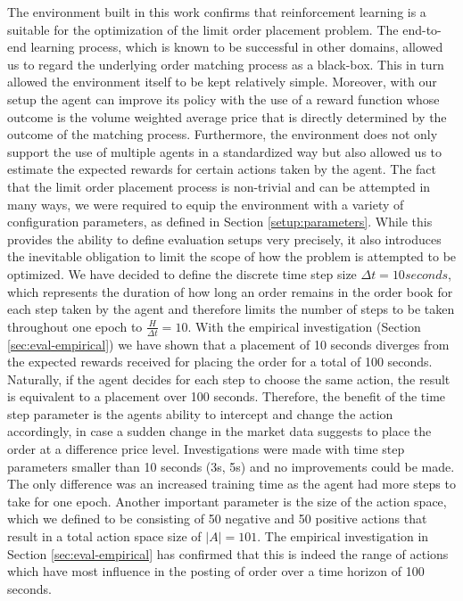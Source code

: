     The environment built in this work confirms that reinforcement learning is a suitable for the optimization of the limit order placement problem.
    The end-to-end learning process, which is known to be successful in other domains\cite{amodei2016deep, mnih2015human, mnih2013playing}, allowed us to regard the underlying order matching process as a black-box.
    This in turn allowed the environment itself to be kept relatively simple.
    Moreover, with our setup the agent can improve its policy with the use of a reward function whose outcome is the volume weighted average price that is directly determined by the outcome of the matching process.
    Furthermore, the environment does not only support the use of multiple agents in a standardized way but also allowed us to estimate the expected rewards for certain actions taken by the agent.
    The fact that the limit order placement process is non-trivial and can be attempted in many ways, we were required to equip the environment with a variety of configuration parameters, as defined in Section \ref{setup:parameters}.
    While this provides the ability to define evaluation setups very precisely, it also introduces the inevitable obligation to limit the scope of how the problem is attempted to be optimized.
    We have decided to define the discrete time step size $\Delta{t}=10 seconds$, which represents the duration of how long an order remains in the order book for each step taken by the agent and therefore limits the number of steps to be taken throughout one epoch to $\frac{H}{\Delta{t}}=10$.
    With the empirical investigation (Section \ref{sec:eval-empirical}) we have shown that a placement of 10 seconds diverges from the expected rewards received for placing the order for a total of 100 seconds.
    Naturally, if the agent decides for each step to choose the same action, the result is equivalent to a placement over 100 seconds.
    Therefore, the benefit of the time step parameter is the agents ability to intercept and change the action accordingly, in case a sudden change in the market data suggests to place the order at a difference price level.
    Investigations were made with time step parameters smaller than 10 seconds (3s, 5s) and no improvements could be made.
    The only difference was an increased training time as the agent had more steps to take for one epoch.
    Another important parameter is the size of the action space, which we defined to be consisting of 50 negative and 50 positive actions that result in a total action space size of $|A|=101$.
    The empirical investigation in Section \ref{sec:eval-empirical} has confirmed that this is indeed the range of actions which have most influence in the posting of order over a time horizon of 100 seconds.
